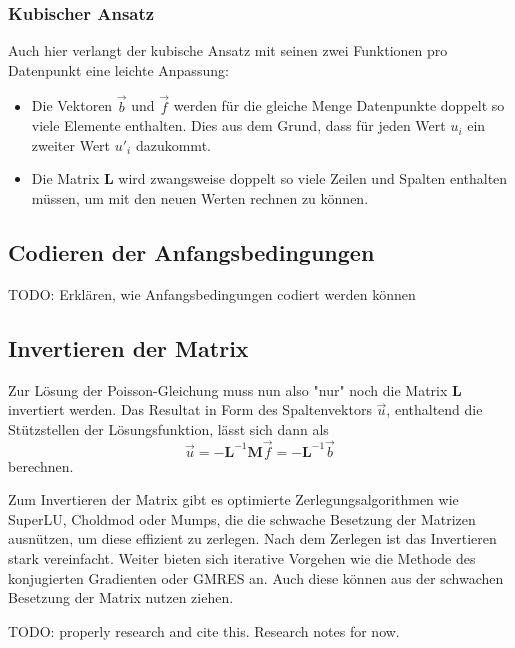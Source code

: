 \subsubsection{Kubischer Ansatz}
Auch hier verlangt der kubische Ansatz mit seinen zwei Funktionen pro Datenpunkt eine leichte Anpassung: 
\begin{itemize}
    \item Die Vektoren $\vec{b}$ und $\vec{f}$ werden für die gleiche Menge Datenpunkte doppelt so viele Elemente enthalten.
          Dies aus dem Grund, dass für jeden Wert $u_i$ ein zweiter Wert $u'_i$ dazukommt.
    \item Die Matrix $\mathbf{L}$ wird zwangsweise doppelt so viele Zeilen und Spalten enthalten müssen, um mit den neuen Werten rechnen zu können. %
\end{itemize}


\subsection{Codieren der Anfangsbedingungen\label{fem:1d:anfangsbedingungen}}
TODO: Erklären, wie Anfangsbedingungen codiert werden können


\subsection{Invertieren der Matrix\label{fem:1d:matrix_invertieren}}
Zur Lösung der Poisson-Gleichung muss nun also "nur" noch die Matrix $\mathbf{L}$ invertiert werden.
Das Resultat in Form des Spaltenvektors $\vec{u}$, enthaltend die Stützstellen der Lösungsfunktion, lässt sich dann als
\begin{equation}
    \vec{u} = - \mathbf{L}^{-1}\mathbf{M}\vec{f} = - \mathbf{L}^{-1}\vec{b}
\end{equation}
berechnen.

Zum Invertieren der Matrix gibt es optimierte Zerlegungsalgorithmen wie SuperLU, Choldmod oder Mumps, die die schwache Besetzung der Matrizen ausnützen, um diese effizient zu zerlegen.
Nach dem Zerlegen ist das Invertieren stark vereinfacht.
Weiter bieten sich iterative Vorgehen wie die Methode des konjugierten Gradienten oder GMRES an.
Auch diese können aus der schwachen Besetzung der Matrix nutzen ziehen.

TODO: properly research and cite this. Research notes for now.
